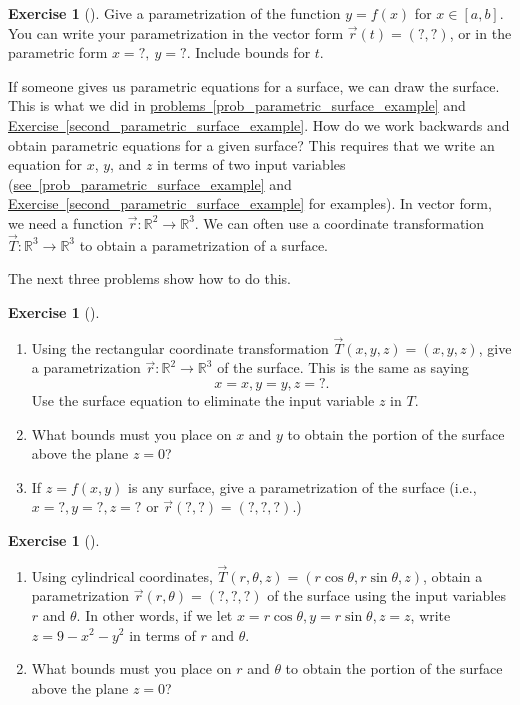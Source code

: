 \documentclass[10pt,]{book}
\theoremstyle{plain}
\theoremstyle{definition}
\theoremstyle{definition}
\theoremstyle{definition}
\theoremstyle{definition}
\newtheorem{exploration}[project]{Exercise}
\theoremstyle{definition}
\numberwithin{equation}{section}
\begin{document}
\begin{exploration}[]\label{exploration-123}
Give a parametrization of the function \(y=f(x)\) for \(x\in[a,b]\). You can write your parametrization in the vector form \(\vec r(t)=(?,?)\), or in the parametric form \(x=?,\ y=?\). Include bounds for \(t\).%
\end{exploration}
If someone gives us parametric equations for a surface, we can draw the surface. This is what we did in \hyperref[prob_parametric_surface_example]{problems~\ref{prob_parametric_surface_example}} and \hyperref[second_parametric_surface_example]{Exercise~\ref{second_parametric_surface_example}}. How do we work backwards and obtain parametric equations for a given surface? This requires that we write an equation for \(x\), \(y\), and \(z\) in terms of two input variables (\hyperref[prob_parametric_surface_example]{see~\ref{prob_parametric_surface_example}} and \hyperref[second_parametric_surface_example]{Exercise~\ref{second_parametric_surface_example}} for examples). In vector form, we need a function \(\vec r\colon \mathbb{R}^2\to\mathbb{R}^3\). We can often use a coordinate transformation \(\vec T\colon \mathbb{R}^3\to\mathbb{R}^3\) to obtain a parametrization of a surface.%
\par
The next three problems show how to do this.%
\begin{exploration}[]\label{x3d_parametric_plot}
\leavevmode%
\begin{enumerate}[font=\bfseries,label=(\alph*),ref=\alph*]
\item\label{task-247} Using the rectangular coordinate transformation \(\vec T(x,y,z)=(x,y,z)\), give a parametrization \(\vec r\colon \mathbb{R}^2\to\mathbb{R}^3\) of the surface. This is the same as saying%
\begin{equation*}
x=x, y=y, z=?.
\end{equation*}
Use the surface equation to eliminate the input variable \(z\) in \(T\).%
%
\item\label{task-248} What bounds must you place on \(x\) and \(y\) to obtain the portion of the surface above the plane \(z=0\)?%
\item\label{task-249} If \(z=f(x,y)\) is any surface, give a parametrization of the surface (i.e., \(x=?, y=?, z=?\) or \(\vec r (?,?)=(?,?,?)\).)%
\end{enumerate}
\end{exploration}
\begin{exploration}[]\label{exploration-125}
\leavevmode%
\begin{enumerate}[font=\bfseries,label=(\alph*),ref=\alph*]
\item\label{task-250} Using cylindrical coordinates, \(\vec T(r,\theta,z) = (r\cos \theta, r\sin\theta, z)\), obtain a parametrization \(\vec r(r,\theta)=(?,?,?)\) of the surface using the input variables \(r\) and \(\theta\). In other words, if we let \(x=r\cos \theta, y=r\sin\theta, z=z\), write \(z=9-x^2-y^2\) in terms of \(r\) and \(\theta\).%
\item\label{task-251} What bounds must you place on \(r\) and \(\theta\) to obtain the portion of the surface above the plane \(z=0\)?%
\end{enumerate}
\end{exploration}
\end{document}
